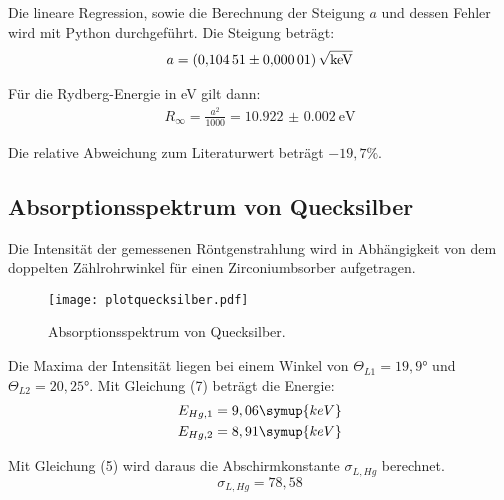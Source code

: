 Die lineare Regression, sowie die Berechnung der Steigung $a$ und dessen Fehler wird mit Python durchgeführt.
Die Steigung beträgt:
\begin{align*}
  a = \SI{0.10451(1)}{\sqrt{\kilo\eV}}
\end{align*}

Für die Rydberg-Energie in eV gilt dann:
\begin{align*}
  R_{\infty} = \frac{a^2}{1000} =\SI{10.922(2)}{\eV}
\end{align*}

Die relative Abweichung zum Literaturwert beträgt $-19,7 \%$.


\subsection{Absorptionsspektrum von Quecksilber}

Die Intensität der gemessenen Röntgenstrahlung wird in Abhängigkeit von dem doppelten Zählrohrwinkel für
einen Zirconiumbsorber aufgetragen.

\begin{figure}[H]
  \centering
  \texttt{[image: plotquecksilber.pdf]}
  \caption{Absorptionsspektrum von Quecksilber.}
  \label{fig:plot}
\end{figure}


Die Maxima der Intensität liegen bei einem Winkel von $\Theta_{L1} = 19,9°$  und $\Theta_{L2} = 20,25°$.
Mit Gleichung (7) beträgt die Energie:
\begin{align*}
  E_{Hg,1} = 9,06 \symup{keV} \\
  E_{Hg,2} = 8,91 \symup{keV}
\end{align*}

Mit Gleichung (5) wird daraus die Abschirmkonstante $\sigma_{L, Hg}$ berechnet.
\begin{equation*}
  \sigma_{L, Hg} = 78,58
\end{equation*}
